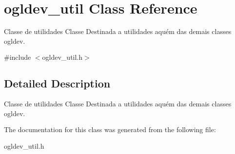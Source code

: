 \hypertarget{classogldev__util}{\section{ogldev\-\_\-util Class Reference}
\label{classogldev__util}
}


Classe de utilidades Classe Destinada a utilidades aquém das demais classes ogldev.  




{\ttfamily \#include $<$ogldev\-\_\-util.\-h$>$}



\subsection{Detailed Description}
Classe de utilidades Classe Destinada a utilidades aquém das demais classes ogldev. 

The documentation for this class was generated from the following file\-:\begin{DoxyCompactItemize}
\item 
ogldev\-\_\-util.\-h\end{DoxyCompactItemize}
